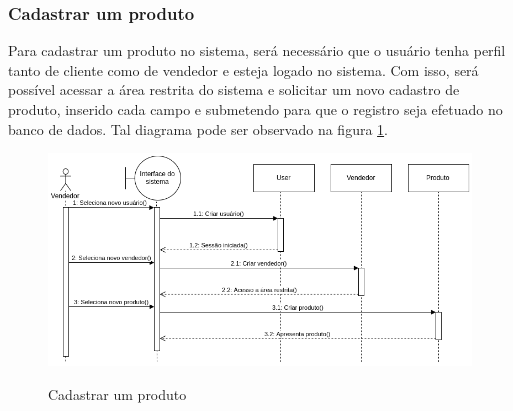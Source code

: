 \subsubsection{Cadastrar um produto}
Para cadastrar um produto no sistema, será necessário que o usuário tenha perfil tanto de cliente como de vendedor e esteja logado no sistema. Com isso, será possível acessar a área restrita do sistema e solicitar um novo cadastro de produto, inserido cada campo e submetendo para que o registro seja efetuado no banco de dados. Tal diagrama pode ser observado na figura \ref{fig:sequence1}.
\begin{figure}[htbp!]
  \centering
  \caption{Cadastrar um produto}
  \includegraphics[width=1\textwidth]{figs/sequence1.png}
    \label{fig:sequence1}
\end{figure}

